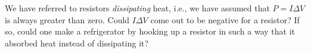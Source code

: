 We have referred to resistors \emph{dissipating} heat,
        i.e., we have assumed that $P=I\Delta V$ is always greater
        than zero.  Could $I\Delta V$ come out to be negative for
        a resistor?  If so, could one make a refrigerator by hooking
        up a resistor in such a way that it absorbed heat instead of dissipating it?
